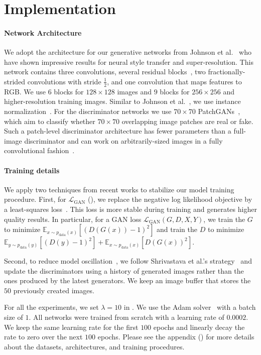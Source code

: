 \section{Implementation}

\paragraph{Network Architecture}
We adopt the architecture for our generative networks from Johnson et al.~ who have shown impressive results for neural style transfer and super-resolution. This network contains three convolutions, several residual blocks~\cite{he2016deep},  two fractionally-strided convolutions with stride $\frac{1}{2}$,  and one convolution that maps features to RGB. We use $6$ blocks for $128\times128$ images and $9$ blocks for $256\times 256$ and higher-resolution training images. Similar to Johnson et al.~, we use instance normalization~\cite{ulyanov2016instance}. For the discriminator networks we use $70\times 70$ PatchGANs~\cite{isola2016image,li2016precomputed,ledig2016photo}, which aim to classify whether $70 \times 70$ overlapping image patches are real or fake. Such a patch-level discriminator architecture has fewer parameters than a full-image discriminator and can work on arbitrarily-sized images in a fully convolutional fashion~\cite{isola2016image}. 


\paragraph{Training details}
We apply two techniques from recent works to stabilize our model training procedure. First, for $\mathcal{L}_{\text{GAN}}$ (), we replace the negative log likelihood objective by a least-squares loss~\cite{mao2017least}. This loss is more stable during training and generates higher quality results. In particular, for a GAN loss $\mathcal{L}_{\text{GAN}}(G,D,X,Y)$, we train the $G$ to minimize $\mathbb{E}_{x \sim p_{\text{data}}(x)}[(D(G(x))-1)^2]$ and train the $D$ to minimize $\mathbb{E}_{y \sim p_{\text{data}}(y)}[(D(y)-1)^2]+\mathbb{E}_{x \sim p_{\text{data}}(x)}[D(G(x))^2]$.

Second, to reduce model oscillation~\cite{goodfellow2016nips}, we follow Shrivastava et al.'s strategy~\cite{shrivastava2016learning} and update the discriminators using a history of generated images rather than the ones produced by the
latest generators. We keep an image buffer that stores the $50$ previously created images. 


For all the experiments, we set $\lambda=10$ in .
We use the Adam solver~\cite{kingma2014adam} with a batch size of $1$. All networks were trained from scratch with a learning rate of $0.0002$. We keep the same learning rate for the first $100$ epochs and linearly decay the rate to zero over the next $100$ epochs.
Please see the appendix () for more details about the datasets, architectures, and training procedures.
